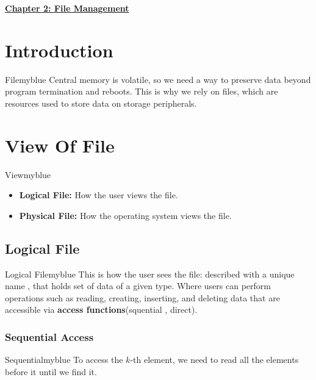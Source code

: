 \newpage
\null
\vspace{0.15cm}

\begin{center}
    \Huge{\textbf{\underline{Chapter 2: File Management}}}
\end{center}

\setcounter{section}{0}

\vspace{0.35cm}

\section{Introduction}
\begin{prettyBox}{File}{myblue}
Central memory is volatile, so we need a way to preserve data beyond 
program termination and reboots. This is why we rely on files, 
which are resources used to store data on storage peripherals.
\end{prettyBox}

\vspace{0.35cm}
\section{View Of File}
\begin{prettyBox}{View}{myblue}
\begin{itemize}
    \item \textbf{Logical File:} How the user views the file. 
    \item \textbf{Physical File:} How the operating system views the file.
\end{itemize}
\end{prettyBox}

\vspace{0.25cm}
\subsection{Logical File}
\begin{prettyBox}{Logical File}{myblue}
This is how the user sees the file: described with a unique name , that holds set of data of a given type. Where users can perform operations 
such as reading, creating, inserting, and deleting data that are accessible via \textbf{access functions}(squential , direct).
\end{prettyBox}

\vspace{0.25cm}
\subsubsection{Sequential Access}
\begin{prettyBox}{Sequential}{myblue}
To access the \(k\)-th element, we need to read all the elements before it until we find it.
\end{prettyBox}

